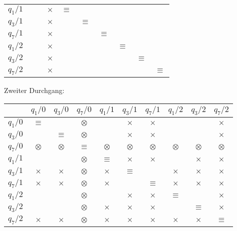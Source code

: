 \begin{loesung}
\begin{teilaufgaben}
\begin{center}
\begin{tabular}{|c|ccccccccc|}
$q_1/1$  &         &         &$\times$ &$\equiv$ &         &         &         &         &         \\
$q_3/1$  &         &         &$\times$ &         &$\equiv$ &         &         &         &         \\
$q_7/1$  &         &         &$\times$ &         &         &$\equiv$ &         &         &         \\
$q_1/2$  &         &         &$\times$ &         &         &         &$\equiv$ &         &         \\
$q_3/2$  &         &         &$\times$ &         &         &         &         &$\equiv$ &         \\
$q_7/2$  &         &         &$\times$ &         &         &         &         &         &$\equiv$ \\
\hline
\end{tabular}
\end{center}
Zweiter Durchgang:
\begin{center}
\begin{tabular}{|c|ccccccccc|}
\hline
         &$q_1/0$  &$q_3/0$  &$q_7/0$  &$q_1/1$  &$q_3/1$  &$q_7/1$  &$q_1/2$  &$q_3/2$  &$q_7/2$  \\
\hline
$q_1/0$  &$\equiv$ &         &$\otimes$&         &$\times$ &$\times$ &         &         &$\times$ \\
$q_3/0$  &         &$\equiv$ &$\otimes$&         &$\times$ &$\times$ &         &         &$\times$ \\
$q_7/0$  &$\otimes$&$\otimes$&$\equiv$ &$\otimes$&$\otimes$&$\otimes$&$\otimes$&$\otimes$&$\otimes$\\
$q_1/1$  &         &         &$\otimes$&$\equiv$ &$\times$ &$\times$ &         &$\times$ &$\times$ \\
$q_3/1$  &$\times$ &$\times$ &$\otimes$&$\times$ &$\equiv$ &         &$\times$ &$\times$ &$\times$ \\
$q_7/1$  &$\times$ &$\times$ &$\otimes$&$\times$ &         &$\equiv$ &$\times$ &$\times$ &$\times$ \\
$q_1/2$  &         &         &$\otimes$&         &$\times$ &$\times$ &$\equiv$ &         &$\times$ \\
$q_3/2$  &         &         &$\otimes$&$\times$ &$\times$ &$\times$ &         &$\equiv$ &$\times$ \\
$q_7/2$  &$\times$ &$\times$ &$\otimes$&$\times$ &$\times$ &$\times$ &$\times$ &$\times$ &$\equiv$ \\
\hline
\end{tabular}

\end{center}
\end{teilaufgaben}
\end{loesung}
